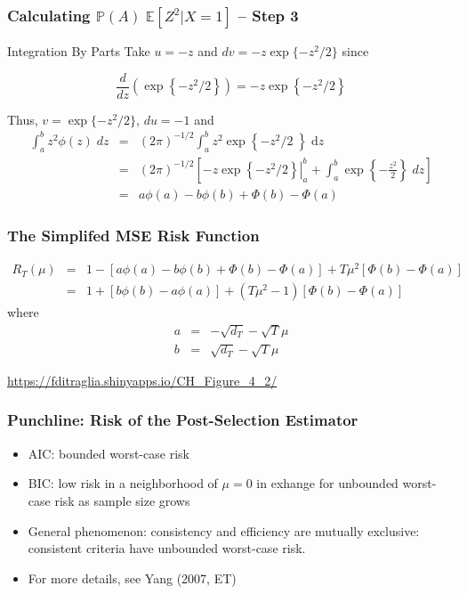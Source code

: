 \begin{frame}
  \frametitle{Calculating $\mathbb{P}(A)\;\mathbb{E}[Z^2|X=1]$ -- Step 3}

  \vspace{1em}

  \begin{block}{Integration By Parts}
  \small 
Take $u = -z$ and $dv = -z \exp\{-z^2/2\}$ since

	$$\frac{d}{dz} \left(\exp\left\{-z^2/2\right\}\right) = -z\exp\left\{-z^2/2\right\}$$

  \vspace{0.5em}

Thus, $v = \exp\{-z^2/2\}$, $du = -1$ and 
\begin{eqnarray*}
  \int_a^b z^2 \phi(z) \; dz &=& \left( 2\pi \right)^{-1/2} \int_a^b z^2 \exp\left\{-z^2/2 \; \right\} \;\text{d}z\\
  &=& \left( 2\pi \right)^{-1/2}\left[-z \exp\left\{ \left.-z^2/2\right\}\right|_a^b+ \int_a^b \exp\left\{-\frac{z^2}{2}\right\}  \; dz \right]\\
		&=& a\phi(a) - b\phi(b) + \Phi(b) - \Phi(a)
\end{eqnarray*}
  \end{block}
\end{frame}
\begin{frame}
  \frametitle{The Simplifed MSE Risk Function}
	\begin{eqnarray*}
		R_T(\mu) &=& 1 - \left[a\phi(a) - b\phi(b) + \Phi(b) - \Phi(a) \right] + T\mu^2 \left[\Phi(b) - \Phi(a) \right]\\
		&=&1 + \left[b\phi(b) - a\phi(a)\right]  + (T\mu^2 - 1) \left[\Phi(b) - \Phi(a) \right] 
	\end{eqnarray*}
where
	\begin{eqnarray*}
		a &=& -\sqrt{d_T} - \sqrt{T}\mu\\
		b &=& \sqrt{d_T} - \sqrt{T}\mu
	\end{eqnarray*}

\url{https://fditraglia.shinyapps.io/CH\_Figure\_4\_2/}
\end{frame}
\begin{frame}
  \frametitle{Punchline: Risk of the Post-Selection Estimator}

  \begin{itemize}
    \item AIC: bounded worst-case risk
    \item BIC: low risk in a neighborhood of $\mu=0$ in exhange for \alert{unbounded} worst-case risk as sample size grows
    \item General phenomenon: consistency and efficiency are mutually exclusive: consistent criteria have unbounded worst-case risk.
    \item For more details, see Yang (2007, ET)
  \end{itemize}

\end{frame}
